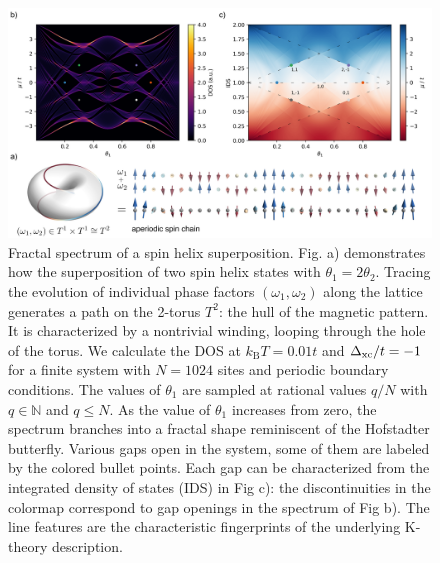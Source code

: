 \documentclass[
    10pt,
    aps,
    prl,
    twocolumn,
    floatfix,
    superscriptaddress
]{revtex4-2}
\begin{document}
\begin{figure}[t!]
    \centering
    \includegraphics[width=0.8\linewidth]{../gfx/figure_01/figure_01.png}
  \caption{ 
  Fractal spectrum of a spin helix superposition. 
  Fig. a) demonstrates how the superposition of two spin helix states with $\theta_1 = 2\theta_2$.
  Tracing the evolution of individual phase factors $(\omega_1, \omega_2)$ along the lattice generates a path on the 2-torus $T^2$: the hull of the magnetic pattern.
  It is characterized by a nontrivial winding, looping through the hole of the torus.
  We calculate the DOS at $k_\mathrm{B} T = 0.01 t$ and $\Delta_\mathrm{xc} / t =-1$ for a finite system with $N=1024$ sites and periodic boundary conditions. 
  The values of $\theta_1$ are sampled at rational values $q/N$ with $q\in \mathbb{N}$ and $q \leq N$.
  As the value of $\theta_1$ increases from zero, the spectrum branches into a fractal shape reminiscent of the Hofstadter butterfly.
  Various gaps open in the system, some of them are labeled by the colored bullet points. 
  Each gap can be characterized from the integrated density of states (IDS) in Fig c): the discontinuities in the colormap correspond to gap openings in the spectrum of Fig b). 
  The line features are the characteristic fingerprints of the underlying K-theory description.
  }  
  \label{fig:limacon}
  \end{figure}
\end{document}

